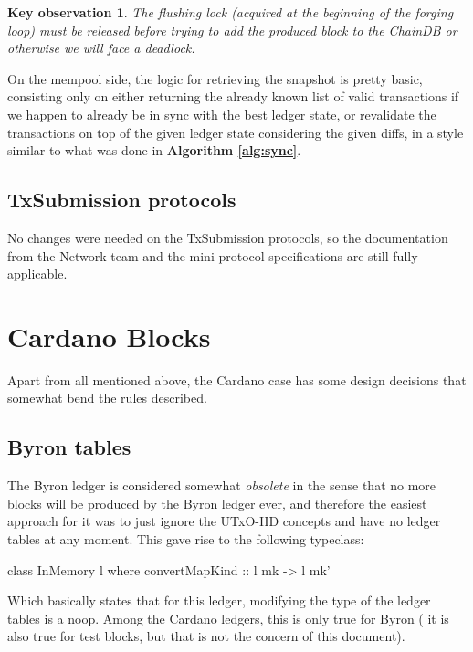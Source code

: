 \documentclass[11pt,a4paper]{article}
\theoremstyle{definition}
\newtheorem{observation}{Key observation}
\begin{document}
\begin{observation}
  \emph{The flushing lock (acquired at the beginning of the forging loop) must
    be released before trying to add the produced block to the ChainDB or
    otherwise we will face a deadlock.}
\end{observation}

On the mempool side, the logic for retrieving the snapshot is pretty basic,
consisting only on either returning the already known list of valid transactions
if we happen to already be in sync with the best ledger state, or revalidate the
transactions on top of the given ledger state considering the given diffs, in
a style similar to what was done in \textbf{Algorithm \ref{alg:sync}}.

\subsection{TxSubmission protocols}

No changes were needed on the TxSubmission protocols, so the documentation from
the Network team and the mini-protocol specifications are still fully
applicable.

\section{Cardano Blocks}

Apart from all mentioned above, the Cardano case has some design decisions that
somewhat bend the rules described.

\subsection{Byron tables}

The Byron ledger is considered somewhat \emph{obsolete} in the sense that no
more blocks will be produced by the Byron ledger ever, and therefore the easiest
approach for it was to just ignore the UTxO-HD concepts and have no ledger
tables at any moment. This gave rise to the following typeclass:

\begin{code}
class InMemory l where
  convertMapKind :: l mk -> l mk'
\end{code}
Which basically states that for this ledger, modifying the type of the ledger
tables is a noop. Among the Cardano ledgers, this is only true for Byron ( it is
also true for test blocks, but that is not the concern of this document).
\end{document}
